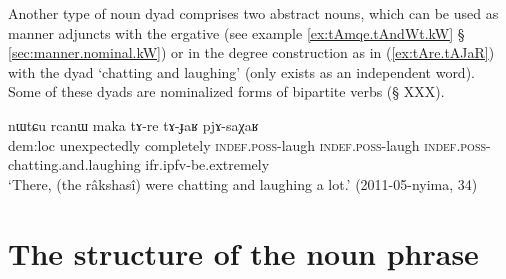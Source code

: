 Another type of noun dyad comprises two abstract nouns, which can be used as manner adjuncts with the ergative (see example \ref{ex:tAmqe.tAndWt.kW} § \ref{sec:manner.nominal.kW}) or in the degree construction as in (\ref{ex:tAre.tAJaR}) with the dyad  `chatting and laughing' (only  exists as an independent word). Some of these dyads are nominalized forms of bipartite verbs (§ XXX).

\begin{exe}
\ex \label{ex:tAre.tAJaR}
 \gll  nɯtɕu rcanɯ maka tɤ-re tɤ-ɟaʁ pjɤ-saχaʁ \\
 dem:loc unexpectedly completely \textsc{indef}.\textsc{poss}-laugh \textsc{indef}.\textsc{poss}-laugh \textsc{indef}.\textsc{poss}-chatting.and.laughing ifr.ipfv-be.extremely \\
 \glt `There, (the râkshasî) were chatting and laughing a lot.' (2011-05-nyima, 34)
\end{exe}

\section{The structure of the noun phrase}



